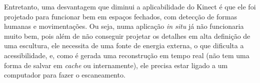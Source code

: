 Entretanto, uma desvantagem que diminui a aplicabilidade do Kinect é que ele foi projetado para funcionar bem em espaços fechados, com detecção de formas humanas e movimentações. Ou seja, numa aplicação \emph{in situ} já não funcionaria muito bem, pois além de não conseguir projetar os detalhes em alta definição de uma escultura, ele necessita de uma fonte de energia externa, o que dificulta a acessibilidade, e, como  é gerada uma reconstrução em tempo real (não tem uma forma de salvar em \emph{cache} ou internamente), ele precisa estar ligado a um computador para fazer o escaneamento.